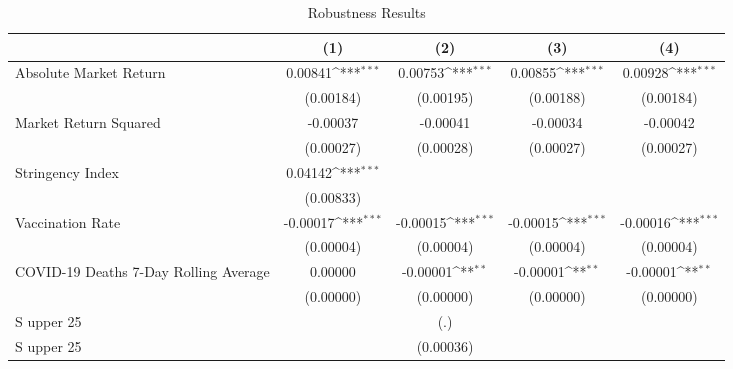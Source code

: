 \begin{table}[htbp]\centering
\def\sym#1{\ifmmode^{#1}\else\(^{#1}\)\fi}
\caption{Robustness Results \label{reg2}}
\begin{tabular}{l*{4}{c}}
\toprule
                    &\multicolumn{1}{c}{(1)}         &\multicolumn{1}{c}{(2)}         &\multicolumn{1}{c}{(3)}         &\multicolumn{1}{c}{(4)}         \\
\midrule
Absolute Market Return&     0.00841\sym{***}&     0.00753\sym{***}&     0.00855\sym{***}&     0.00928\sym{***}\\
                    &   (0.00184)         &   (0.00195)         &   (0.00188)         &   (0.00184)         \\
\addlinespace
Market Return Squared&    -0.00037         &    -0.00041         &    -0.00034         &    -0.00042         \\
                    &   (0.00027)         &   (0.00028)         &   (0.00027)         &   (0.00027)         \\
\addlinespace
Stringency Index    &     0.04142\sym{***}&                     &                     &                     \\
                    &   (0.00833)         &                     &                     &                     \\
\addlinespace
Vaccination Rate    &    -0.00017\sym{***}&    -0.00015\sym{***}&    -0.00015\sym{***}&    -0.00016\sym{***}\\
                    &   (0.00004)         &   (0.00004)         &   (0.00004)         &   (0.00004)         \\
\addlinespace
COVID-19 Deaths 7-Day Rolling Average&     0.00000         &    -0.00001\sym{**} &    -0.00001\sym{**} &    -0.00001\sym{**} \\
                    &   (0.00000)         &   (0.00000)         &   (0.00000)         &   (0.00000)         \\
\addlinespace
S upper 25%
                    &                     &         (.)         &                     &                     \\
\addlinespace
S upper 25%
                    &                     &   (0.00036)         &                     &                     \\

\end{tabular}
\end{table}
